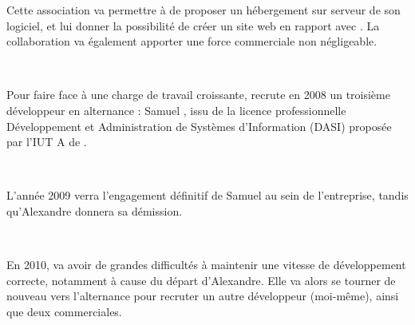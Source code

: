 Cette association va permettre à \solulog{} de proposer un hébergement sur serveur de son logiciel, et lui donner la possibilité de créer un site web en rapport avec \integrale. La collaboration va également apporter une force commerciale non négligeable.

~

Pour faire face à une charge de travail croissante, \solulog{} recrute en 2008 un troisième développeur en alternance : Samuel , issu de la licence professionnelle Développement et Administration de Systèmes d'Information (DASI) proposée par l'IUT A de .

~

L'année 2009 verra l'engagement définitif de Samuel au sein de l'entreprise, tandis qu'Alexandre donnera sa démission.

~

En 2010, \solulog{} va avoir de grandes difficultés à maintenir une vitesse de développement correcte, notamment à cause du départ d'Alexandre. Elle va alors se tourner de nouveau vers l'alternance pour recruter un autre développeur (moi-même), ainsi que deux commerciales.